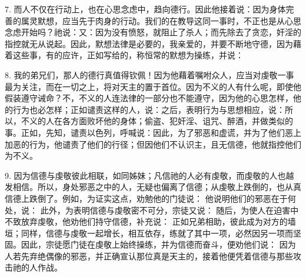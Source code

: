 7. 而人不仅在行动上，也在心思念虑中，趋向德行。因此他接着说：因为身体完善的属灵默想，应当先于肉身的行动。我们的在教导这同一事时，不正也是从心思念虑开始吗？祂说：又：因为没有愤怒，就阻止了杀人；而先除去了贪恋，奸淫的指控就无从说起。因此，默想法律是必要的，我亲爱的，并要不断地守德，因为藉着这些事，有的应许，正如写给的，称恒常的默想为操练，并说：\par

8. 我的弟兄们，那人的德行真值得钦佩！因为他藉着嘱咐众人，应当对虔敬一事最为关注，而在一切之上，将对天主的置于首位。因为不义的人有什么呢，即使他假装遵守诫命？不，不义的人连法律的一部分也不能遵守，因为他的心思怎样，他的行为也必怎样；正如谴责这样的人，说：之后，表明行为与思想相应，说：所以，不义的人在各方面败坏他的身体；偷盗、犯奸淫、诅咒、醉酒，并做类似的事。正如，先知，谴责以色列，呼喊说：因此，为了邪恶和虚谎，并为了他们恶上加恶的行为，他谴责了他们的行径；但因他们不认识主，且无信德，他就指控他们为不义。\par

9. 因为信德与虔敬彼此相联，如同姊妹；凡信祂的人必有虔敬，而虔敬的人也越发相信。所以，身处邪恶之中的人，无疑也偏离了信德；从虔敬上跌倒的，也从真信德上跌倒了。例如，为证实这点，劝勉他的门徒说： 他说明他们的邪恶在于何处，说： 此外，为表明信德与虔敬密不可分，宗徒又说： 随后，为使人在迫害中不致放弃虔敬，他劝他们持守信德，补充说： 正如兄弟相助，彼此成为对方的墙垣；同样，信德与虔敬一起增长，相互依存，练就了其中一项，必然因另一项而坚固。因此，宗徒愿门徒在虔敬上始终操练，并为信德而奋斗，便劝他们说： 因为人若先弃绝偶像的邪恶，并正确宣认那位真是天主的，接着他便凭着信德与那些攻击祂的人作战。\par

